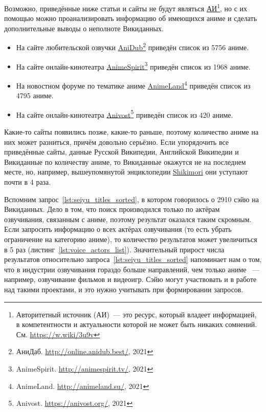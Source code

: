 Возможно, приведённые ниже статьи и сайты не будут являться \href{https://w.wiki/3u9v}{АИ}\footnote{Авторитетный источник (АИ)~--- это ресурс, который владеет информацией, в компетентности и актуальности которой не может быть никаких сомнений. См. \href{https://w.wiki/3u9v}{https://w.wiki/3u9v}}, но с их помощью можно проанализировать информацию об имеющихся аниме и сделать дополнительные выводы о неполноте Викиданных.

\begin{itemize}
	\item На сайте любительской озвучки \href{http://online.anidub.best/}{AniDub}\footnote{АниДаб. \href{http://online.anidub.best/}{http://online.anidub.best/}, 2021} приведён список из \num{5756} аниме.
	\item На сайте онлайн-кинотеатра \href{http://animespirit.tv/}{AnimeSpirit}\footnote{AnimeSpirit. \href{http://animespirit.tv/}{http://animespirit.tv/}, 2021} приведён список из \num{1968} аниме.
	\item На новостном форуме по тематике аниме \href{http://animeland.su/}{AnimeLand}\footnote{AnimeLand. \href{http://animeland.su/}{http://animeland.su/}, 2021} приведён список из \num{4795} аниме.
	\item На сайте онлайн-кинотеатра \href{https://anivost.org/}{Anivost}\footnote{Anivost. \href{https://anivost.org/}{https://anivost.org/}, 2021} приведён список из \num{420} аниме.
\end{itemize}

Какие-то сайты появились позже, какие-то раньше, поэтому количество аниме на них может разниться, причём довольно серьёзно. Если упорядочить все приведённые сайты, данные Русской Википедии, Английской Википедии и Викиданные по количеству аниме, то Викиданные окажутся не на последнем месте, но, например, вышеупомянутой энциклопедии \href{https://shikimori.one/}{Shikimori} они уступают почти в 4 раза.

Вспомним запрос~\ref{lst:seiyu_titles_sorted}, в котором говорилось о \num{2910} сэйю на Викиданных. Дело в том, что поиск производился только по актёрам озвучивания, связанным с аниме, поэтому результат оказался таким скромным. Если запросить информацию о всех актёрах озвучивания (то есть убрать ограничение на категорию аниме), то количество результатов может увеличиться в \num{5} раз (листинг~\ref{lst:voice_actors_list}). Значительный прирост числа результатов относительно запроса~\ref{lst:seiyu_titles_sorted} напоминает нам о том, что в индустрии озвучивания гораздо больше направлений, чем только аниме ~--- например, озвучивание фильмов и видеоигр. Сэйю могут участвовать и в работе над такими проектами, и это нужно учитывать при формировании запросов. 


